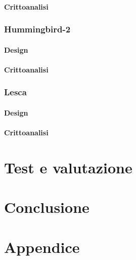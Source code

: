 \documentclass[target=bach,aauheader=,style=]{thud}
\begin{document}
			\subsubsection{Crittoanalisi}
		\subsection{Hummingbird-2\cite{hummingbird2}}
			\subsubsection{Design}
			\subsubsection{Crittoanalisi}
		\subsection{Lesca\cite{lesca}}
			\subsubsection{Design}
			\subsubsection{Crittoanalisi}
\chapter{Test e valutazione}

\chapter{Conclusione}



\appendix


\chapter{Appendice}


\backmatter





\end{document}
